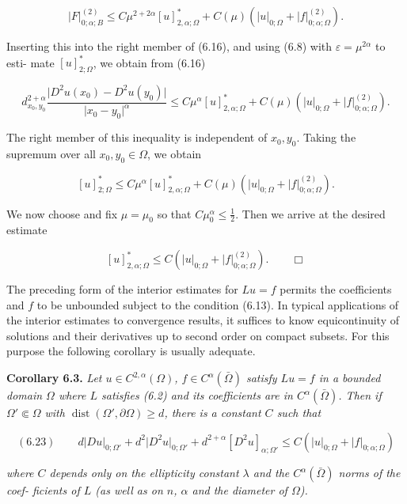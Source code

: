 \begin{theorem}
\[
\lvert F\rvert^{(2)}_{0;\alpha;B}\le C\mu^{2+2\alpha}[u]^{*}_{2,\alpha;\Omega}+C(\mu)(\lvert u\rvert_{0;\Omega}+\lvert f\rvert^{(2)}_{0;\alpha;\Omega}).
\]

\noindent Inserting this into the right member of (6.16), and using (6.8) with $\varepsilon=\mu^{2\alpha}$ to esti-
mate $[u]^{*}_{2;\Omega}$, we obtain from (6.16)

\[
d^{2+\alpha}_{x_0,y_0}\frac{\lvert D^2u(x_0)-D^2u(y_0)\rvert}{\lvert x_0-y_0\rvert^\alpha}
\le C\mu^{\alpha}[u]^{*}_{2,\alpha;\Omega}+C(\mu)(\lvert u\rvert_{0;\Omega}+\lvert f\rvert^{(2)}_{0;\alpha;\Omega}).
\]

\noindent The right member of this inequality is independent of $x_0,y_0$. Taking the supremum
over all $x_0, y_0\in \Omega$, we obtain

\[
[u]^{*}_{2;\Omega}\le C\mu^{\alpha}[u]^{*}_{2,\alpha;\Omega}+C(\mu)(\lvert u\rvert_{0;\Omega}+\lvert f\rvert^{(2)}_{0;\alpha;\Omega}).
\]

\noindent We now choose and fix $\mu=\mu_0$ so that $C\mu_0^\alpha\le \tfrac12$. Then we arrive at the desired
estimate

\[
[u]^{*}_{2,\alpha;\Omega}\le C(\lvert u\rvert_{0;\Omega}+\lvert f\rvert^{(2)}_{0;\alpha;\Omega}).
\qquad \Box
\]
\end{theorem}

\noindent The preceding form of the interior estimates for $Lu=f$ permits the coefficients
and $f$ to be unbounded subject to the condition (6.13). In typical applications of the
interior estimates to convergence results, it suffices to know equicontinuity of
solutions and their derivatives up to second order on compact subsets. For this
purpose the following corollary is usually adequate.

\noindent \textbf{Corollary 6.3.} \textit{Let $u\in C^{2,\alpha}(\Omega)$, $f\in C^{\alpha}(\bar{\Omega})$ satisfy $Lu=f$ in a bounded domain $\Omega$
where $L$ satisfies (6.2) and its coefficients are in $C^{\alpha}(\bar{\Omega})$. Then if $\Omega' \Subset \Omega$ with
$\operatorname{dist}(\Omega',\partial\Omega)\ge d$, there is a constant $C$ such that}

\begin{equation*}
(6.23)\qquad d\lvert Du\rvert_{0;\Omega'}+d^2\lvert D^2u\rvert_{0;\Omega'}+d^{2+\alpha}[D^2u]_{\alpha;\Omega'}\le C(\lvert u\rvert_{0;\Omega}+\lvert f\rvert_{0;\alpha;\Omega})
\end{equation*}

\noindent \textit{where $C$ depends only on the ellipticity constant $\lambda$ and the $C^{\alpha}(\bar{\Omega})$ norms of the coef-
ficients of $L$ (as well as on $n$, $\alpha$ and the diameter of $\Omega$).}

